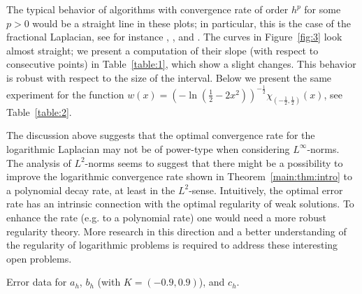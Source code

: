 \documentclass[11 pt]{article}
\numberwithin{equation}{section}
\begin{document}
The typical behavior of algorithms with convergence rate of order $h^p$ for some $p>0$ would be a straight line in these plots; in particular, this is the case of the fractional Laplacian, see for instance \cite[Figure 8]{BH17}, \cite[Figure 1]{AB17}, and \cite[Table 3]{HSJSS23}. The curves in Figure~\ref{fig:3} look almost straight; we present a computation of their slope (with respect to consecutive points) in Table~\ref{table:1}, which show a slight changes. This behavior is robust with respect to the size of the interval.  Below we present the same experiment for the function
$w(x)=\left(
-\ln\left(\frac{1}{2}-2x^2\right)\right)^{-\frac{1}{2}} \chi_{(-\frac{1}{2},\frac{1}{2})}(x)$, see Table~\ref{table:2}.

The discussion above suggests that the optimal convergence rate for the logarithmic Laplacian may not be of power-type when considering $L^\infty$-norms.  The analysis of $L^2$-norms seems to suggest that there might be a possibility to improve the logarithmic convergence rate shown in Theorem~\ref{main:thm:intro} to a polynomial decay rate, at least in the $L^2$-sense. Intuitively, the optimal error rate has an intrinsic connection with the optimal regularity of weak solutions. To enhance the rate (e.g. to a polynomial rate) one would need a more robust regularity theory.  More research in this direction and a better understanding of the regularity of logarithmic problems is required to address these interesting open problems.

\begin{table}[htb]
\centering
%
\data
%
%
\pgfplotstabletypeset[clear infinite, empty cells with={\ensuremath{-}},
every head row/.style={
before row=\toprule,after row=\midrule},
every last row/.style={
after row=\bottomrule},
]{\data}
%
\caption{Error data  for $a_h$, $b_h$ (with $K=(-0.9,0.9)$), and $c_h$.}
\label{table:1}
\end{table}
\end{document}
